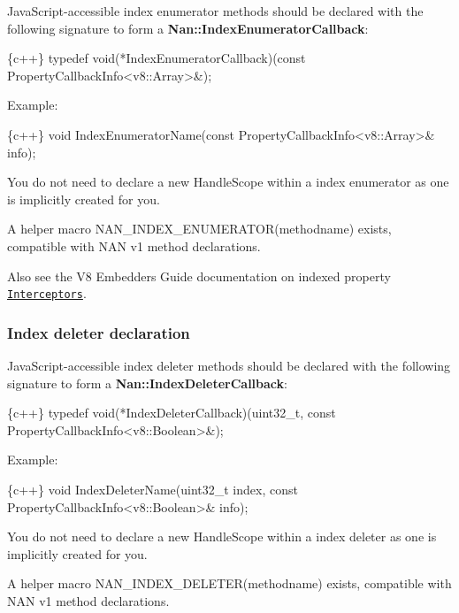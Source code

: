 Java\+Script-\/accessible index enumerator methods should be declared with the following signature to form a {\bfseries {\ttfamily Nan\+::\+Index\+Enumerator\+Callback}}\+:


\begin{DoxyCode}
\{c++\}
typedef void(*IndexEnumeratorCallback)(const PropertyCallbackInfo<v8::Array>&);
\end{DoxyCode}


Example\+:


\begin{DoxyCode}
\{c++\}
void IndexEnumeratorName(const PropertyCallbackInfo<v8::Array>& info);
\end{DoxyCode}


You do not need to declare a new {\ttfamily Handle\+Scope} within a index enumerator as one is implicitly created for you.

A helper macro {\ttfamily N\+A\+N\+\_\+\+I\+N\+D\+E\+X\+\_\+\+E\+N\+U\+M\+E\+R\+A\+T\+O\+R(methodname)} exists, compatible with N\+AN v1 method declarations.

Also see the V8 Embedders Guide documentation on indexed property \href{https://developers.google.com/v8/embed#interceptors}{\tt Interceptors}.

\label{_api_nan_index_deleter}%
 \subsubsection*{Index deleter declaration}

Java\+Script-\/accessible index deleter methods should be declared with the following signature to form a {\bfseries {\ttfamily Nan\+::\+Index\+Deleter\+Callback}}\+:


\begin{DoxyCode}
\{c++\}
typedef void(*IndexDeleterCallback)(uint32\_t,
                                    const PropertyCallbackInfo<v8::Boolean>&);
\end{DoxyCode}


Example\+:


\begin{DoxyCode}
\{c++\}
void IndexDeleterName(uint32\_t index, const PropertyCallbackInfo<v8::Boolean>& info);
\end{DoxyCode}


You do not need to declare a new {\ttfamily Handle\+Scope} within a index deleter as one is implicitly created for you.

A helper macro {\ttfamily N\+A\+N\+\_\+\+I\+N\+D\+E\+X\+\_\+\+D\+E\+L\+E\+T\+E\+R(methodname)} exists, compatible with N\+AN v1 method declarations.

